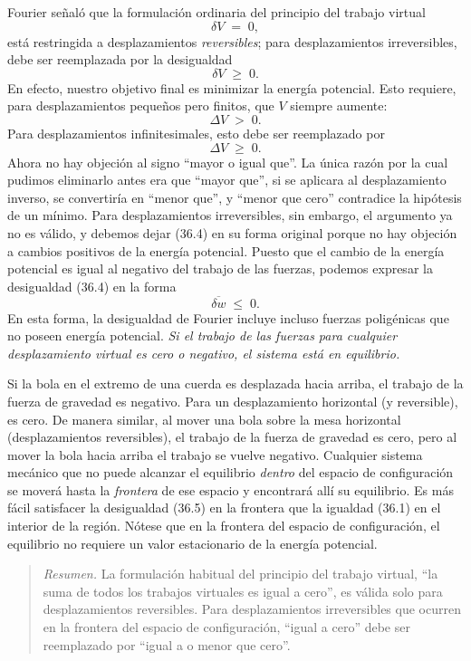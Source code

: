 Fourier señaló que la formulación ordinaria del principio del trabajo virtual
\begin{equation}
\delta V \;=\; 0, \tag{36.1}
\end{equation}
está restringida a desplazamientos \emph{reversibles}; para desplazamientos irreversibles, debe ser reemplazada por la desigualdad
\begin{equation}
\delta V \;\geq\; 0. \tag{36.2}
\end{equation}
En efecto, nuestro objetivo final es minimizar la energía potencial. Esto requiere, para desplazamientos pequeños pero finitos, que $V$ siempre aumente:
\begin{equation}
\Delta V \;>\; 0. \tag{36.3}
\end{equation}
Para desplazamientos infinitesimales, esto debe ser reemplazado por
\begin{equation}
\Delta V \;\geq\; 0. \tag{36.4}
\end{equation}
Ahora no hay objeción al signo ``mayor o igual que''. La única razón por la cual pudimos eliminarlo antes era que ``mayor que'', si se aplicara al desplazamiento inverso, se convertiría en ``menor que'', y ``menor que cero'' contradice la hipótesis de un mínimo. Para desplazamientos irreversibles, sin embargo, el argumento ya no es válido, y debemos dejar (36.4) en su forma original porque no hay objeción a cambios positivos de la energía potencial. Puesto que el cambio de la energía potencial es igual al negativo del trabajo de las fuerzas, podemos expresar la desigualdad (36.4) en la forma
\begin{equation}
\overline{\delta w} \;\leq\; 0. \tag{36.5}
\end{equation}
En esta forma, la desigualdad de Fourier incluye incluso fuerzas poligénicas que no poseen energía potencial. \emph{Si el trabajo de las fuerzas para cualquier desplazamiento virtual es cero o negativo, el sistema está en equilibrio.}

Si la bola en el extremo de una cuerda es desplazada hacia arriba, el trabajo de la fuerza de gravedad es negativo. Para un desplazamiento horizontal (y reversible), es cero. De manera similar, al mover una bola sobre la mesa horizontal (desplazamientos reversibles), el trabajo de la fuerza de gravedad es cero, pero al mover la bola hacia arriba el trabajo se vuelve negativo. Cualquier sistema mecánico que no puede alcanzar el equilibrio \emph{dentro} del espacio de configuración se moverá hasta la \emph{frontera} de ese espacio y encontrará allí su equilibrio. Es más fácil satisfacer la desigualdad (36.5) en la frontera que la igualdad (36.1) en el interior de la región. Nótese que en la frontera del espacio de configuración, el equilibrio no requiere un valor estacionario de la energía potencial.

\begin{quote}
\textit{Resumen.} La formulación habitual del principio del trabajo virtual, ``la suma de todos los trabajos virtuales es igual a cero'', es válida solo para desplazamientos reversibles. Para desplazamientos irreversibles que ocurren en la frontera del espacio de configuración, ``igual a cero'' debe ser reemplazado por ``igual a o menor que cero''.
\end{quote}

